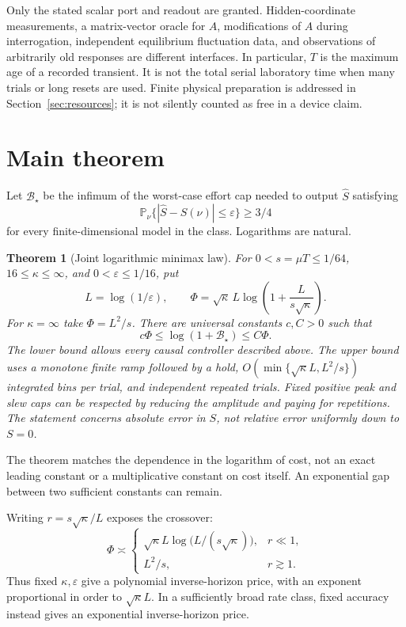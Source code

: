 \documentclass[11pt,a4paper]{article}
\newtheorem{theorem}{Theorem}
\newcommand{\Prob}{\mathbb P}
\begin{document}
Only the stated scalar port and readout are granted. Hidden-coordinate measurements, a matrix-vector oracle for $A$, modifications of $A$ during interrogation, independent equilibrium fluctuation data, and observations of arbitrarily old responses are different interfaces. In particular, $T$ is the maximum age of a recorded transient. It is not the total serial laboratory time when many trials or long resets are used. Finite physical preparation is addressed in Section~\ref{sec:resources}; it is not silently counted as free in a device claim.

\section{Main theorem}

Let $\mathcal B_\star$ be the infimum of the worst-case effort cap needed to output $\widehat S$ satisfying
\[
\Prob_\nu\{|\widehat S-S(\nu)|\leq\varepsilon\}\geq3/4
\]
for every finite-dimensional model in the class. Logarithms are natural.

\begin{theorem}[Joint logarithmic minimax law]\label{thm:main}
For $0<s=\mu T\leq1/64$, $16\leq\kappa\leq\infty$, and $0<\varepsilon\leq1/16$, put
\begin{equation}\label{eq:Phi}
L=\log(1/\varepsilon),\qquad
\Phi=\sqrt\kappa\,L\log\!\left(1+\frac{L}{s\sqrt\kappa}\right).
\end{equation}
For $\kappa=\infty$ take $\Phi=L^2/s$. There are universal constants $c,C>0$ such that
\begin{equation}\label{eq:main}
c\Phi\leq\log(1+\mathcal B_\star)\leq C\Phi.
\end{equation}
The lower bound allows every causal controller described above. The upper bound uses a monotone finite ramp followed by a hold, $O(\min\{\sqrt\kappa L,L^2/s\})$ integrated bins per trial, and independent repeated trials. Fixed positive peak and slew caps can be respected by reducing the amplitude and paying for repetitions. The statement concerns absolute error in $S$, not relative error uniformly down to $S=0$.
\end{theorem}

The theorem matches the dependence in the logarithm of cost, not an exact leading constant or a multiplicative constant on cost itself. An exponential gap between two sufficient constants can remain.

Writing $r=s\sqrt\kappa/L$ exposes the crossover:
\begin{equation}\label{eq:regimes}
\Phi\asymp
\begin{cases}
\sqrt\kappa L\log\bigl(L/(s\sqrt\kappa)\bigr),&r\ll1,\\
L^2/s,&r\gtrsim1.
\end{cases}
\end{equation}
Thus fixed $\kappa,\varepsilon$ give a polynomial inverse-horizon price, with an exponent proportional in order to $\sqrt\kappa L$. In a sufficiently broad rate class, fixed accuracy instead gives an exponential inverse-horizon price.
\end{document}
